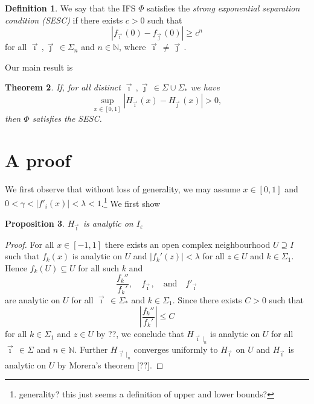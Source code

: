 \documentclass[12pt,]{article}
\newtheorem{theorem}{Theorem}[section]
\newtheorem{proposition}[theorem]{Proposition}
\theoremstyle{definition}
\newtheorem{definition}[theorem]{Definition}
\theoremstyle{remark}
\renewcommand{\Bbb}[1]{\mathbb{#1}}
\newcommand{\bbN}{{\Bbb N}}         %
\newcommand{\0}{\mathbf{0}}
\newcommand{\eps}{\varepsilon}
\newcommand{\bi}{\vec{\imath}\,}
\newcommand{\bj}{\vec{\jmath}\,}
\newcommand{\rfootnote}[1]{\footnote{\color{red}#1}}
\begin{document}
\begin{definition}
  We say that the IFS $\Phi$ satisfies the \emph{strong exponential separation condition (SESC)} if
  there exists $c>0$ such that 
  \[
    |f_{\bi}(0)-f_{\bj}(0)| \geq c^n
  \]
  for all $\bi,\bj\in\Sigma_n$ and $n\in\bbN$, where $\bi\neq\bj$.
\end{definition}

Our main result is
\begin{theorem}
  \label{thm:main}
  If, for all distinct $\bi,\bj \in\Sigma\cup\Sigma_*$ we have
  \[
    \sup_{x\in[0,1]} |H_{\bi}(x) - H_{\bj}(x)| > 0,
  \]
  then $\Phi$ satisfies the SESC.
\end{theorem}






\section{A proof}\label{sec:proof}
We first observe that without loss of generality, we may assume $x\in[0,1]$ and
$0<\gamma<|f'_i(x)|<\lambda<1$.\rfootnote{generality? this just seems a definition of upper and lower
bounds?}
We first show
\begin{proposition}
  $H_{\bi}$ is analytic on $I_{\eps}$
\end{proposition}
\begin{proof}
  For all $x\in [-1,1]$ there exists an open complex neighbourhood $U \supseteq I$ such that
  $f_k(x)$ is analytic on $U$ and $|f_k'(z)|<\lambda$ for all $z\in U$ and $k\in\Sigma_1$.
  Hence $f_k(U) \subseteq U$ for all such $k$ and 
  \[
    \frac{f_k''}{f_k'},\quad f_{\bi}, \quad\text{and} \quad f'_{\bi}
  \]
  are analytic on $U$ for all $\bi\in\Sigma_*$ and $k\in\Sigma_1$.
  Since there exists $C>0$ such that 
  \[
\left|\frac{f_k''}{f_k'}\right| \leq C
  \]
  for all $k\in\Sigma_1$ and $z\in U$ by ??, we conclude that $H_{\bi|_n}$ is analytic on $U$ for
  all $\bi\in\Sigma$ and $n\in\bbN$. Further $H_{\bi|_n}$ converges uniformly to $H_{\bi}$ on $U$
  and $H_{\bi}$ is analytic on $U$ by Morera's theorem [??].
\end{proof}
\end{document}
